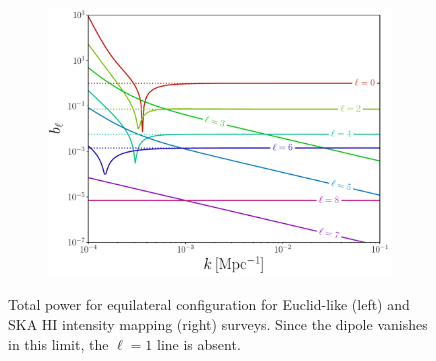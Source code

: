 {\begin{figure}[ht]
\begin{subfigure}{0.5\textwidth}
\end{subfigure}%
\begin{subfigure}{0.5\textwidth}
\includegraphics[width=0.85\linewidth]{fig/totP_IM_equi2.pdf}
\end{subfigure}
\caption{Total power for equilateral configuration for Euclid-like (left) and SKA HI intensity mapping (right) surveys. Since the dipole vanishes in this limit, the \(\ell = 1\) line is absent.\label{fig:totpowereq}}
\end{figure}


}
